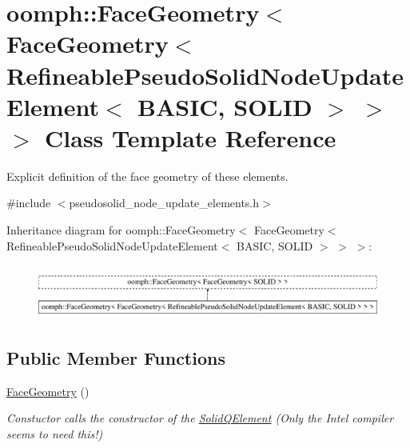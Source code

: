 \hypertarget{classoomph_1_1FaceGeometry_3_01FaceGeometry_3_01RefineablePseudoSolidNodeUpdateElement_3_01BASIC_00_01SOLID_01_4_01_4_01_4}{}\section{oomph\+:\+:Face\+Geometry$<$ Face\+Geometry$<$ Refineable\+Pseudo\+Solid\+Node\+Update\+Element$<$ B\+A\+S\+IC, S\+O\+L\+ID $>$ $>$ $>$ Class Template Reference}
\label{classoomph_1_1FaceGeometry_3_01FaceGeometry_3_01RefineablePseudoSolidNodeUpdateElement_3_01BASIC_00_01SOLID_01_4_01_4_01_4}


Explicit definition of the face geometry of these elements.  




{\ttfamily \#include $<$pseudosolid\+\_\+node\+\_\+update\+\_\+elements.\+h$>$}

Inheritance diagram for oomph\+:\+:Face\+Geometry$<$ Face\+Geometry$<$ Refineable\+Pseudo\+Solid\+Node\+Update\+Element$<$ B\+A\+S\+IC, S\+O\+L\+ID $>$ $>$ $>$\+:\begin{figure}[H]
\begin{center}
\leavevmode
\includegraphics[height=1.786284cm]{classoomph_1_1FaceGeometry_3_01FaceGeometry_3_01RefineablePseudoSolidNodeUpdateElement_3_01BASIC_00_01SOLID_01_4_01_4_01_4}
\end{center}
\end{figure}
\subsection*{Public Member Functions}
\begin{DoxyCompactItemize}
\item 
\hyperlink{classoomph_1_1FaceGeometry_3_01FaceGeometry_3_01RefineablePseudoSolidNodeUpdateElement_3_01BASIC_00_01SOLID_01_4_01_4_01_4_adc2b1a8073ce32b62d259c1e032c19d9}{Face\+Geometry} ()
\begin{DoxyCompactList}\small\item\em Constuctor calls the constructor of the \hyperlink{classoomph_1_1SolidQElement}{Solid\+Q\+Element} (Only the Intel compiler seems to need this!) \end{DoxyCompactList}\end{DoxyCompactItemize}


